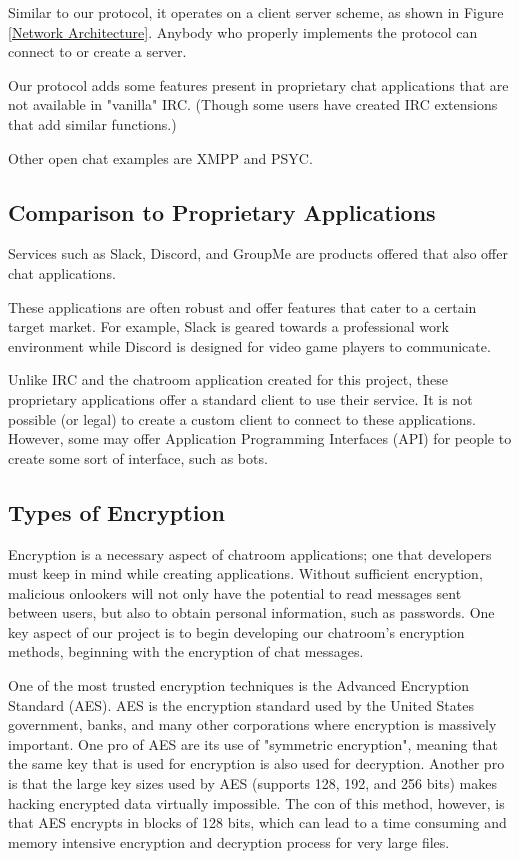 \documentclass{article}
\begin{document}
Similar to our protocol, it operates on a client server scheme, as shown in Figure \ref{Network Architecture}. Anybody who properly implements the protocol can connect to or create a server. 

Our protocol adds some features present in proprietary chat applications that are not available in "vanilla" IRC. (Though some users have created IRC extensions that add similar functions.)

Other open chat examples are XMPP and PSYC. 

\subsection{Comparison to Proprietary Applications}

Services such as Slack, Discord, and GroupMe are products offered that also offer chat applications. 

These applications are often robust and offer features that cater to a certain target market. For example, Slack is geared towards a professional work environment while Discord is designed for video game players to communicate. 

Unlike IRC and the chatroom application created for this project, these proprietary applications offer a standard client to use their service. It is not possible (or legal) to create a custom client to connect to these applications. However, some may offer Application Programming Interfaces (API) for people to create some sort of interface, such as bots. 

\subsection{Types of Encryption}

Encryption is a necessary aspect of chatroom applications; one that developers must keep in mind while creating applications. Without sufficient encryption, malicious onlookers will not only have the potential to read messages sent between users, but also to obtain personal information, such as passwords. One key aspect of our project is to begin developing our chatroom's encryption methods, beginning with the encryption of chat messages. 

One of the most trusted encryption techniques is the Advanced Encryption Standard (AES). AES is the encryption standard used by the United States government, banks, and many other corporations where encryption is massively important. One pro of AES are its use of "symmetric encryption", meaning that the same key that is used for encryption is also used for decryption. Another pro is that the large key sizes used by AES (supports 128, 192, and 256 bits) makes hacking encrypted data virtually impossible. The con of this method, however, is that AES encrypts in blocks of 128 bits, which can lead to a time consuming and memory intensive encryption and decryption process for very large files. 
\end{document}
